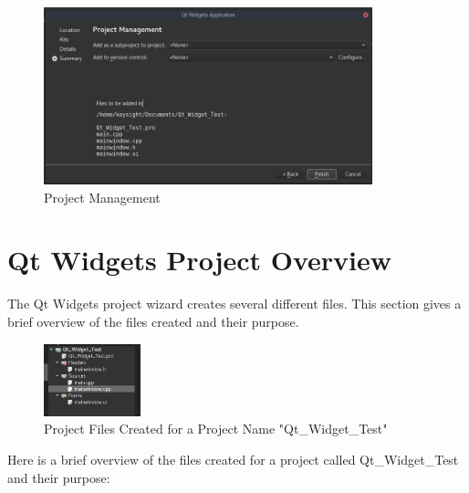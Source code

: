 \documentclass{article}
\begin{document}
\begin{enumerate}[1.)]
			\begin{figure}[H]
				\centering
				\includegraphics[width=0.85\textwidth]{pics/Project_Management.png}
				\caption{Project Management}
				\label{Project_Management}
			\end{figure}		
		
	\end{enumerate}


\section{Qt Widgets Project Overview}

The Qt Widgets project wizard creates several different files. This section gives a brief overview of the files created and their purpose.


	\begin{figure}[H]
		\centering
		\includegraphics[width=0.25\textwidth]{pics/Project_Files.png}
		\caption{Project Files Created for a Project Name "Qt\_Widget\_Test"}
		\label{Project_Files}
	\end{figure}


Here is a brief overview of the files created for a project called Qt\_Widget\_Test and their purpose:
\end{document}
